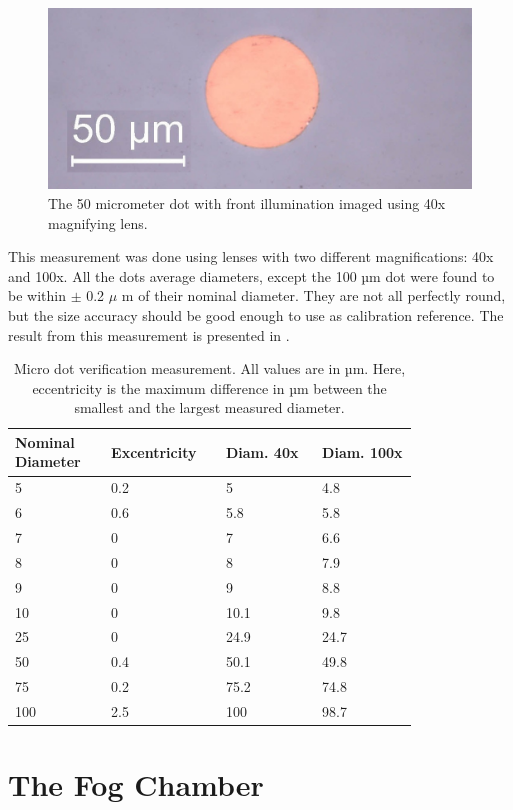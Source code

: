 \begin{figure}[ht]
\centering\includegraphics[width=0.75\linewidth]{./figures/50umdot40x.jpg}
\caption{The 50 micrometer dot with front illumination imaged using 40x magnifying lens.}
\label{fig:50umdot40x}
\end{figure}

This measurement was done using lenses with two different magnifications: 40x and 100x. All the dots average diameters, except the 100 µm dot were found to be within $\pm$ 0.2 $\mu$ m of their nominal diameter. They are not all perfectly round, but the size accuracy should be good enough to use as calibration reference. The result from this measurement is presented in .

\begin{table}[ht]
\centering
\begin{tabular}{p{0.2\linewidth} p{0.2\linewidth} p{0.2\linewidth} p{0.2\linewidth}}
\hline
\textbf{Nominal Diameter} & \textbf{Excentricity} & \textbf{Diam. 40x} & \textbf{Diam. 100x} \\
\hline
5 & 0.2 & 5 & 4.8 \\
6 & 0.6 & 5.8 & 5.8 \\
7 & 0 & 7 & 6.6 \\
8 & 0 & 8 & 7.9 \\
9 & 0 & 9 & 8.8 \\
10 & 0 & 10.1 & 9.8 \\
25 & 0 & 24.9 & 24.7 \\
50 & 0.4 & 50.1 & 49.8 \\
75 & 0.2 & 75.2 & 74.8 \\
100 & 2.5 & 100 & 98.7 \\
\hline
\end{tabular}
\caption{Micro dot verification measurement. All values are in µm. Here, eccentricity is the maximum difference in µm between the smallest and the largest measured diameter.}
\label{tab:ref_meas}
\end{table}



\section{The Fog Chamber}

